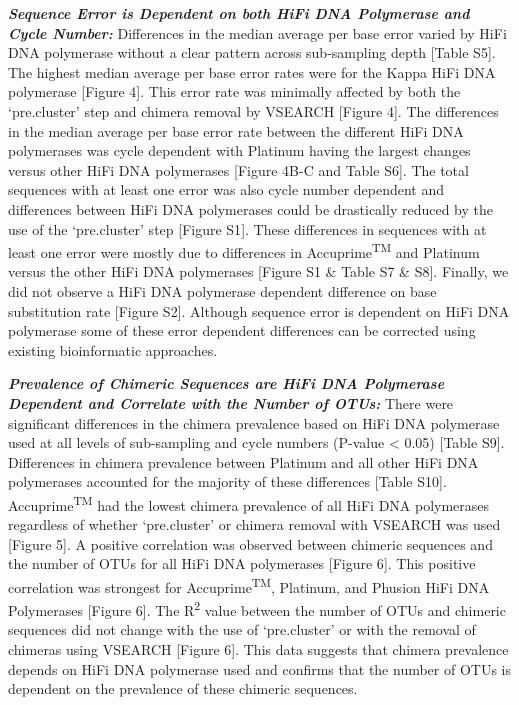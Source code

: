 \documentclass[12pt,]{article}
\begin{document}
\textbf{\emph{Sequence Error is Dependent on both HiFi DNA Polymerase
and Cycle Number:}} Differences in the median average per base error
varied by HiFi DNA polymerase without a clear pattern across
sub-sampling depth {[}Table S5{]}. The highest median average per base
error rates were for the Kappa HiFi DNA polymerase {[}Figure 4{]}. This
error rate was minimally affected by both the `pre.cluster' step and
chimera removal by VSEARCH {[}Figure 4{]}. The differences in the median
average per base error rate between the different HiFi DNA polymerases
was cycle dependent with Platinum having the largest changes versus
other HiFi DNA polymerases {[}Figure 4B-C and Table S6{]}. The total
sequences with at least one error was also cycle number dependent and
differences between HiFi DNA polymerases could be drastically reduced by
the use of the `pre.cluster' step {[}Figure S1{]}. These differences in
sequences with at least one error were mostly due to differences in
Accuprime\textsuperscript{TM} and Platinum versus the other HiFi DNA
polymerases {[}Figure S1 \& Table S7 \& S8{]}. Finally, we did not
observe a HiFi DNA polymerase dependent difference on base substitution
rate {[}Figure S2{]}. Although sequence error is dependent on HiFi DNA
polymerase some of these error dependent differences can be corrected
using existing bioinformatic approaches.

\textbf{\emph{Prevalence of Chimeric Sequences are HiFi DNA Polymerase
Dependent and Correlate with the Number of OTUs:}} There were
significant differences in the chimera prevalence based on HiFi DNA
polymerase used at all levels of sub-sampling and cycle numbers (P-value
\textless{} 0.05) {[}Table S9{]}. Differences in chimera prevalence
between Platinum and all other HiFi DNA polymerases accounted for the
majority of these differences {[}Table S10{]}.
Accuprime\textsuperscript{TM} had the lowest chimera prevalence of all
HiFi DNA polymerases regardless of whether `pre.cluster' or chimera
removal with VSEARCH was used {[}Figure 5{]}. A positive correlation was
observed between chimeric sequences and the number of OTUs for all HiFi
DNA polymerases {[}Figure 6{]}. This positive correlation was strongest
for Accuprime\textsuperscript{TM}, Platinum, and Phusion HiFi DNA
Polymerases {[}Figure 6{]}. The R\textsuperscript{2} value between the
number of OTUs and chimeric sequences did not change with the use of
`pre.cluster' or with the removal of chimeras using VSEARCH {[}Figure
6{]}. This data suggests that chimera prevalence depends on HiFi DNA
polymerase used and confirms that the number of OTUs is dependent on the
prevalence of these chimeric sequences.
\end{document}
